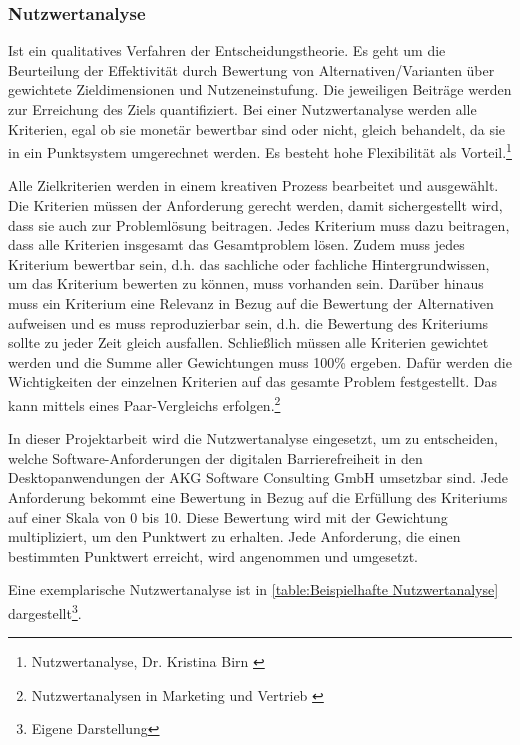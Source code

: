 \subsubsection{Nutzwertanalyse}

Ist ein qualitatives Verfahren der Entscheidungstheorie. Es geht um die Beurteilung der Effektivität durch Bewertung von Alternativen/Varianten über gewichtete Zieldimensionen und Nutzeneinstufung. Die jeweiligen Beiträge werden zur Erreichung des Ziels quantifiziert. Bei einer Nutzwertanalyse werden alle Kriterien, egal ob sie monetär bewertbar sind oder nicht, gleich behandelt, da sie in ein Punktsystem umgerechnet werden. Es besteht hohe Flexibilität als Vorteil.\footnote{Nutzwertanalyse, Dr. Kristina Birn \cite{Dr.KB-Projektmanagment}}

Alle Zielkriterien werden in einem kreativen Prozess bearbeitet und ausgewählt. Die Kriterien müssen der Anforderung gerecht werden, damit sichergestellt wird, dass sie auch zur Problemlösung beitragen. Jedes Kriterium muss dazu beitragen, dass alle Kriterien insgesamt das Gesamtproblem lösen. Zudem muss jedes Kriterium bewertbar sein, d.h. das sachliche oder fachliche Hintergrundwissen, um das Kriterium bewerten zu können, muss vorhanden sein. Darüber hinaus muss ein Kriterium eine Relevanz in Bezug auf die Bewertung der Alternativen aufweisen und es muss reproduzierbar sein, d.h. die Bewertung des Kriteriums sollte zu jeder Zeit gleich ausfallen. Schließlich müssen alle Kriterien gewichtet werden und die Summe aller Gewichtungen muss 100\% ergeben. Dafür werden die Wichtigkeiten der einzelnen Kriterien auf das gesamte Problem festgestellt. Das kann mittels eines Paar-Vergleichs erfolgen.\footnote{Nutzwertanalysen in Marketing und Vertrieb \cite{kuhnapfel2014nutzwertanalysen}}

In dieser Projektarbeit wird die Nutzwertanalyse eingesetzt, um zu entscheiden, welche Software-Anforderungen der digitalen Barrierefreiheit in den Desktopanwendungen der AKG Software Consulting GmbH umsetzbar sind. Jede Anforderung bekommt eine Bewertung in Bezug auf die Erfüllung des Kriteriums auf einer Skala von 0 bis 10. Diese Bewertung wird mit der Gewichtung multipliziert, um den Punktwert zu erhalten. Jede Anforderung, die einen bestimmten Punktwert erreicht, wird angenommen und umgesetzt. 

Eine exemplarische Nutzwertanalyse ist in \cref{table:Beispielhafte Nutzwertanalyse} dargestellt\footnote{Eigene Darstellung}.

